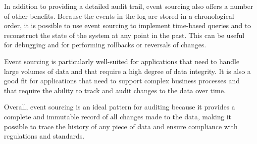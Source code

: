 In addition to providing a detailed audit trail, event sourcing also offers a number of other benefits. Because the events in the log are stored in a chronological order, it is possible to use event sourcing to implement time-based queries and to reconstruct the state of the system at any point in the past. This can be useful for debugging and for performing rollbacks or reversals of changes.

Event sourcing is particularly well-suited for applications that need to handle large volumes of data and that require a high degree of data integrity. It is also a good fit for applications that need to support complex business processes and that require the ability to track and audit changes to the data over time.

Overall, event sourcing is an ideal pattern for auditing because it provides a complete and immutable record of all changes made to the data, making it possible to trace the history of any piece of data and ensure compliance with regulations and standards.

